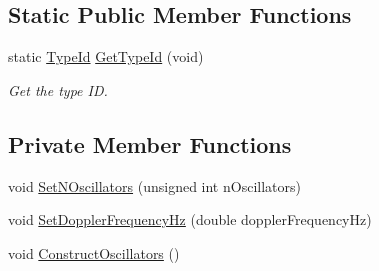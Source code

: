 \subsection*{Static Public Member Functions}
\begin{DoxyCompactItemize}
\item 
static \hyperlink{classns3_1_1TypeId}{Type\+Id} \hyperlink{classns3_1_1JakesProcess_ad91f96bbc00fc188c9495f8098062b9f}{Get\+Type\+Id} (void)
\begin{DoxyCompactList}\small\item\em Get the type ID. \end{DoxyCompactList}\end{DoxyCompactItemize}
\subsection*{Private Member Functions}
\begin{DoxyCompactItemize}
\item 
void \hyperlink{classns3_1_1JakesProcess_a2d2d4ba512f07ac22bf304995441c90c}{Set\+N\+Oscillators} (unsigned int n\+Oscillators)
\item 
void \hyperlink{classns3_1_1JakesProcess_a72d872b63520e1107c6c56177edd87ee}{Set\+Doppler\+Frequency\+Hz} (double doppler\+Frequency\+Hz)
\item 
void \hyperlink{classns3_1_1JakesProcess_afcf181e47a7961a2dd20c5f44a4f5bd1}{Construct\+Oscillators} ()
\end{DoxyCompactItemize}
